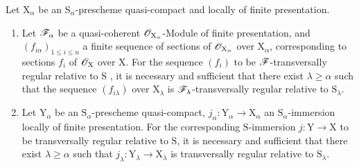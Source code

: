 \begin{proposition}[19.8.2]
\label{IV.19.8.2}
Let $\mathrm{X}_\alpha$ be an $\mathrm{S}_\alpha$-prescheme quasi-compact and locally of finite presentation.
\begin{enumerate}
\item[\rm(i)] Let $\mathscr{F}_\alpha$ be a quasi-coherent $\mathscr{O}_{\mathrm{X}_\alpha}$-Module of finite presentation, and $(f_{i\alpha})_{1\leqslant i\leqslant n}$ a finite sequence of sections of $\mathscr{O}_{\mathrm{X}_\alpha}$ over $\mathrm{X}_\alpha$, corresponding to sections $f_i$ of $\mathscr{O}_\mathrm{X}$ over $\mathrm{X}$. For the sequence $(f_i)$ to be $\mathscr{F}$-transversally regular relative to $\mathrm{S}$ \emph{}, it is necessary and sufficient that there exist $\lambda\geqslant\alpha$ such that the sequence $(f_{i\lambda})$ over $\mathrm{X}_\lambda$ is $\mathscr{F}_\lambda$-transversally regular relative to $\mathrm{S}_\lambda$.
\item[\rm(ii)] Let $\mathrm{Y}_\alpha$ be an $\mathrm{S}_\alpha$-prescheme quasi-compact, $j_\alpha:\mathrm{Y}_\alpha\to\mathrm{X}_\alpha$ an $\mathrm{S}_\alpha$-immersion locally of finite presentation. For the corresponding $\mathrm{S}$-immersion $j:\mathrm{Y}\to\mathrm{X}$ to be transversally regular relative to $\mathrm{S}$, it is necessary and sufficient that there exist $\lambda\geqslant\alpha$ such that $j_\lambda:\mathrm{Y}_\lambda\to\mathrm{X}_\lambda$ is transversally regular relative to $\mathrm{S}_\lambda$.
\end{enumerate}
\end{proposition}

